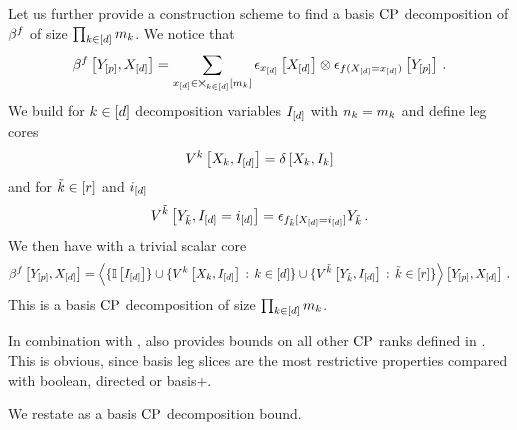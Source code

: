 Let us further provide a construction scheme to find a basis $\mathrm{CP}$ decomposition of $\beta^{f}$ of size $\prod_{k\in[d]}m_{k}$.
We notice that
\begin{align*}
    \beta^{f}\left[Y_{[p]},X_{[d]}\right]
    = \sum_{x_{[d]}\in\bigtimes_{k\in[d]}[m_{k}]} \epsilon_{x_{[d]}}\left[X_{[d]}\right] \otimes \epsilon_{f(X_{[d]}=x_{[d]})}\left[Y_{[p]}\right] \, .
\end{align*}
We build for $k\in[d]$ decomposition variables $I_{[d]}$ with $n_{k}=m_{k}$ and define leg cores %
\begin{align*}
    V^{k}\left[X_{k},I_{[d]}\right] = \delta\left[X_{k},I_{k}\right]
\end{align*}
and for $\tilde{k}\in[r]$ and $i_{[d]}$
\begin{align*}
    V^{\tilde{k}}\left[Y_{\tilde{k}},I_{[d]}=i_{[d]}\right]
    = \epsilon_{f_{\tilde{k}}[X_{[d]}=i_{[d]}]}{Y_{\tilde{k}}} \, .
\end{align*}
We then have with a trivial scalar core
\begin{align*}
    \beta^{f}\left[Y_{[p]},X_{[d]}\right]
    = \left\langle 
        \{\mathbb{I}\left[I_{[d]}\right]\}\cup
        \{V^{k}\left[X_{k},I_{[d]}\right] \, : \, k\in[d]\} \cup
        \{V^{\tilde{k}}\left[Y_{\tilde{k}},I_{[d]}\right] \, : \, \tilde{k}\in[r]\}
    \right\rangle \left[ Y_{[p]},X_{[d]} \right] \, .
\end{align*}
This is a basis $\mathrm{CP}$ decomposition of size $\prod_{k\in[d]}m_{k}$.

In combination with ,  also provides bounds on all other $\mathrm{CP}$ ranks defined in .
This is obvious, since basis leg slices are the most restrictive properties compared with boolean, directed or basis+.


We restate  as a basis $\mathrm{CP}$ decomposition bound.

